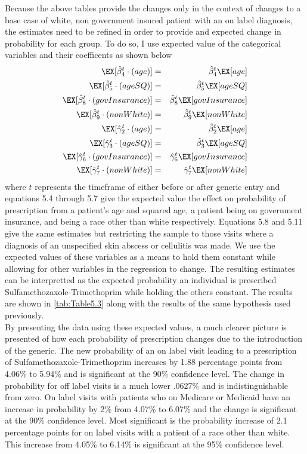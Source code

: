 
\newpage
Because the above tables provide the changes only in the context of changes to a base case of white, non government insured patient with an on label diagnosis, the estimates need to be refined in order to provide and expected change in probability for each group. To do so, I use expected value of the categorical variables and their coefficents as shown below
\begin{eqnarray}
    \EX[\hat{\beta}_4^t\cdot(age)] &=& \hat{\beta}_4^t\EX[age]\\
    \EX[\hat{\beta}_5^t\cdot(ageSQ)] &=& \hat{\beta}_5^t\EX[ageSQ]\\
    \EX[\hat{\beta}_8^t\cdot(govInsurance)] &=& \hat{\beta}_8^t\EX[govInsurance]\\
    \EX[\hat{\beta}_9^t\cdot(nonWhite)] &=& \hat{\beta}_9^t\EX[nonWhite]\\
    \EX[\hat{\gamma}_2^t\cdot(age)] &=& \hat{\beta}_2^t\EX[age]\\
    \EX[\hat{\gamma}_3^t\cdot(ageSQ)] &=& \hat{\beta}_3^t\EX[ageSQ]\\
    \EX[\hat{\gamma}_6^t\cdot(govInsurance)] &=& \hat{\gamma}_6^t\EX[govInsurance]\\
    \EX[\hat{\gamma}_7^t\cdot(nonWhite)] &=& \hat{\gamma}_7^t\EX[nonWhite]
\end{eqnarray}
where $t$ represents the timeframe of either before or after generic entry and equations 5.4 through 5.7 give the expected value the effect on probability of prescription from a patient's age and squared age, a patient being on government insurance, and being a race other than white respectively. Equations 5.8 and 5.11 give the same estimates but restricting the sample to those visits where a diagnosis of an unspecified skin abscess or cellulitis was made. We use the expected values of these variables as a means to hold them constant while allowing for other variables in the regression to change. The resulting estimates can be interpretted as the expected probability an individual is prescribed Sulfamethozaxole-Trimethoprim while holding the others constant. The results are shown in \autoref{tab:Table5.3} along with the results of the same hypothesis used previously.\\
\indent By presenting the data using these expected values, a much clearer picture is presented of how each probability of prescription changes due to the introduction of the generic. The new probability of an on label visit leading to a prescription of Sulfamethozaxole-Trimethoprim increases by 1.88 percentage points from 4.06\% to 5.94\% and is significant at the 90\% confidence level. The change in probability for off label visits is a much lower .0627\% and is indistinguishable from zero. On label visits with patients who on Medicare or Medicaid have an increase in probability by 2\% from 4.07\% to 6.07\% and the change is significant at the 90\% confidence level. Most significant is the probability increase of 2.1 percentage points for on label visits with a patient of a race other than white. This increase from 4.05\% to 6.14\% is significant at the 95\% confidence level.\\
